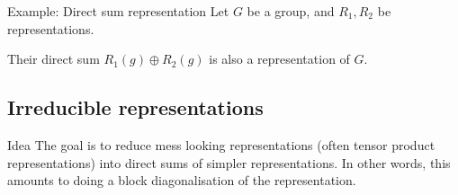 \documentclass[a4paper]{article}
\begin{document}
\begin{parag}{Example: Direct sum representation}
    Let $G$ be a group, and $R_1, R_2$ be representations.

    Their direct sum $R_1\left(g\right) \oplus R_2\left(g\right)$ is also a representation of $G$. 
\end{parag}

\subsection{Irreducible representations}

\begin{parag}{Idea}
    The goal is to reduce mess looking representations (often tensor product representations) into direct sums of simpler representations. In other words, this amounts to doing a block diagonalisation of the representation.
\end{parag}
\end{document}
